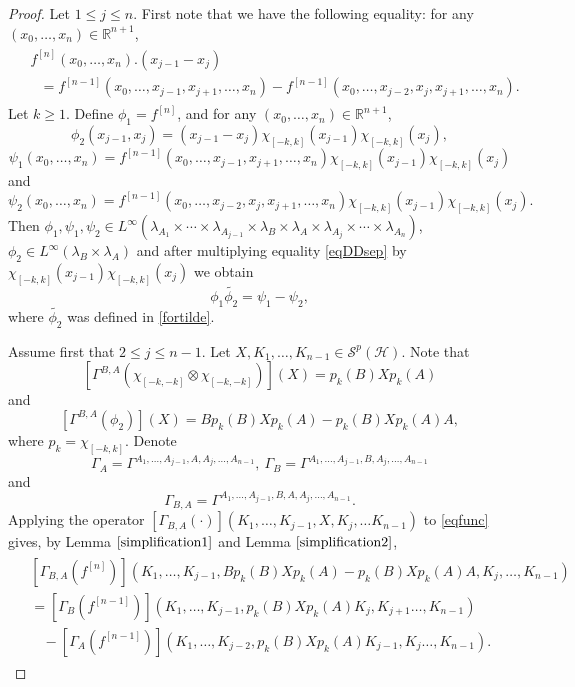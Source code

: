 \documentclass[12pt]{amsart}
\theoremstyle{remark}
\begin{document}
\begin{proof}
Let $1 \leq j \leq n$. First note that we have the following equality: for any $(x_0, \ldots, x_n) \in \mathbb{R}^{n+1}$,
\begin{align}\label{eqDDsep}
\begin{split}
& f^{[n]}(x_0, \ldots, x_n).(x_{j-1} - x_j) \\
& \ \ \ = f^{[n-1]}(x_0,\ldots,x_{j-1}, x_{j+1}, \ldots,x_n) - f^{[n-1]}(x_0,\ldots,x_{j-2}, x_{j},x_{j+1},\ldots,x_n).
\end{split}
\end{align}
Let $k\geq 1$. Define $\phi_1 = f^{[n]}$, and for any $(x_0, \ldots, x_n) \in \mathbb{R}^{n+1}$,
$$
\phi_2(x_{j-1},x_j) = (x_{j-1} - x_j)\chi_{[-k,k]}(x_{j-1})\chi_{[-k,k]}(x_{j}),
$$
$$\psi_1(x_0, \ldots, x_n) = f^{[n-1]}(x_0,\ldots,x_{j-1}, x_{j+1}, \ldots,x_n)\chi_{[-k,k]}(x_{j-1})\chi_{[-k,k]}(x_{j})$$ and
$$\psi_2(x_0, \ldots, x_n) = f^{[n-1]}(x_0,\ldots,x_{j-2}, x_{j},x_{j+1},\ldots,x_n)\chi_{[-k,k]}(x_{j-1})\chi_{[-k,k]}(x_{j}).$$
Then $\phi_1, \psi_1, \psi_2 \in L^{\infty}(\lambda_{A_1} \times \cdots \times  \lambda_{A_{j-1}} \times \lambda_B \times \lambda_A \times \lambda_{A_j} \times \cdots \times \lambda_{A_n})$, $\phi_2 \in L^{\infty}(\lambda_B \times \lambda_A)$ and after multiplying equality \eqref{eqDDsep} by $\chi_{[-k,k]}(x_{j-1})\chi_{[-k,k]}(x_{j})$ we obtain
\begin{equation}\label{eqfunc}
\phi_1 \widetilde{\phi_2} = \psi_1 - \psi_2,
\end{equation}
where $\widetilde{\phi_2}$ was defined in \eqref{fortilde}.

Assume first that $2 \leq j \leq n-1$. Let $X, K_1, \ldots, K_{n-1} \in \mathcal{S}^p(\mathcal{H})$. Note that
$$
\left[\Gamma^{B,A}(\chi_{[-k,-k]} \otimes \chi_{[-k,-k]})\right](X) = p_k(B)Xp_k(A)
$$
and
$$
\left[\Gamma^{B,A}(\phi_2)\right](X) = Bp_k(B)Xp_k(A) - p_k(B)Xp_k(A)A,
$$
where $p_k = \chi_{[-k,k]}$.
Denote
$$\Gamma_A = \Gamma^{A_1, \ldots, A_{j-1}, A, A_j, \ldots, A_{n-1}}, \ \Gamma_B = \Gamma^{A_1, \ldots, A_{j-1}, B, A_j, \ldots, A_{n-1}}$$
and
$$\Gamma_{B,A} = \Gamma^{A_1, \ldots, A_{j-1}, B, A, A_j, \ldots, A_{n-1}}.$$
Applying the operator $\left[\Gamma_{B,A}(\cdot)\right](K_1, \ldots, K_{j-1}, X, K_j, \ldots K_{n-1})$ to \eqref{eqfunc} gives, by Lemma $\ref{simplification1}$ and Lemma $\ref{simplification2}$,
\begin{align}\label{eqfunc2}
\begin{split}
& \left[ \Gamma_{B,A}(f^{[n]})\right](K_1, \ldots, K_{j-1}, Bp_k(B)Xp_k(A) - p_k(B)Xp_k(A)A, K_j, \ldots, K_{n-1}) \\
& = \left[ \Gamma_B(f^{[n-1]})\right](K_1, \ldots, K_{j-1}, p_k(B)Xp_k(A) K_j, K_{j+1} \ldots, K_{n-1})\\
& \ \ \ \ - \left[ \Gamma_A(f^{[n-1]})\right](K_1, \ldots, K_{j-2}, p_k(B)Xp_k(A) K_{j-1}, K_j \ldots, K_{n-1}).
\end{split}
\end{align}



\end{proof}
\end{document}
